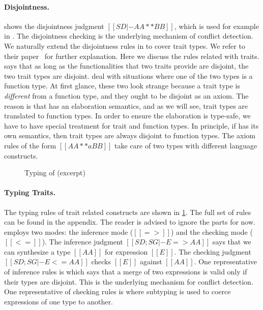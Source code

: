 \paragraph{Disjointness.}
 shows the disjointness judgment $[[SD |- AA ** BB]]$, which is
used for example in . The disjointness checking is the underlying
mechanism of conflict detection. We naturally extend the disjointness rules in
\fname to cover trait types. We refer to
their paper~\cite{alpuimdisjoint} for further explanation. Here we discuss
the rules
related with traits.  says that as long as the functionalities
that two traits provide are disjoint, the two trait types are disjoint.
 deal with situations where one of the two types
is a function type. At first glance, these two look strange because a trait type is
\textit{different} from a function type, and they ought to be disjoint as an axiom. The reason
is that \sedel has an elaboration semantics, and as we will see, trait types are translated to function
types. In order to ensure the elaboration is type-safe, we have to have special treatment for trait
and function types. In principle, if \sedel has its own semantics, then trait types are always disjoint
to function types. The axiom rules of the form $[[ AA **a BB ]]$ take care of two types with different language constructs.

\begin{figure}[t]
  \centering
  \begin{small}
  \end{small}
  \caption{Typing of \sedel (excerpt)}
  \label{fig:type}
\end{figure}

\paragraph{Typing Traits.}
The typing rules of trait related constructs are shown in \cref{fig:type}. The full set of rules can be found in the appendix.
The reader is advised to ignore the  parts for now.
\sedel employs two modes: the inference mode
($[[=>]]$) and the checking mode ($[[<=]]$). The inference judgment $[[ SD ; SG |- E => AA]]$
says that we can synthesize a type $[[AA]]$ for expression $[[E]]$.
The checking judgment $[[SD; SG |- E <= AA]]$ checks $[[E]]$ against $[[AA]]$. One representative of inference rules is
which says that a merge of two expressions is valid only if their types are disjoint. This is the underlying
mechanism for conflict detection. One representative of checking rules is
where subtyping is used to coerce expressions of one type to another.


